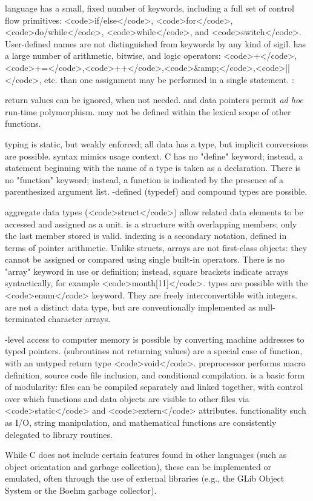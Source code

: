 \documentclass{article}\usepackage{titlesec}
\begin{document}
\begin{itemize}\itemThe language has a small, fixed number of keywords, including a full set of control flow primitives: <code>if/else</code>, <code>for</code>, <code>do/while</code>, <code>while</code>, and <code>switch</code>. User-defined names are not distinguished from keywords by any kind of sigil.
\itemIt has a large number of arithmetic, bitwise, and logic operators: <code>+</code>,<code>+=</code>,<code>++</code>,<code>&amp;</code>,<code>||</code>, etc.
\itemMore than one assignment may be performed in a single statement.
\itemFunctions:
\begin{itemize}\itemFunction return values can be ignored, when not needed.
\itemFunction and data pointers permit \emph{ad hoc} run-time polymorphism.
\itemFunctions may not be defined within the lexical scope of other functions.\end{itemize}
\itemData typing is static, but weakly enforced; all data has a type, but implicit conversions are possible.
\itemDeclaration syntax mimics usage context. C has no "define" keyword; instead, a statement beginning with the name of a type is taken as a declaration. There is no "function" keyword; instead, a function is indicated by the presence of a parenthesized argument list.
\itemUser-defined (typedef) and compound types are possible.
\begin{itemize}\itemHeterogeneous aggregate data types (<code>struct</code>) allow related data elements to be accessed and assigned as a unit.
\itemUnion is a structure with overlapping members; only the last member stored is valid.
\itemArray indexing is a secondary notation, defined in terms of pointer arithmetic. Unlike structs, arrays are not first-class objects: they cannot be assigned or compared using single built-in operators. There is no "array" keyword in use or definition; instead, square brackets indicate arrays syntactically, for example <code>month[11]</code>.
\itemEnumerated types are possible with the <code>enum</code> keyword. They are freely interconvertible with integers.
\itemStrings are not a distinct data type, but are conventionally implemented as null-terminated character arrays.\end{itemize}
\itemLow-level access to computer memory is possible by converting machine addresses to typed pointers.
\itemProcedures (subroutines not returning values) are a special case of function, with an untyped return type <code>void</code>.
\itemA preprocessor performs macro definition, source code file inclusion, and conditional compilation.
\itemThere is a basic form of modularity: files can be compiled separately and linked together, with control over which functions and data objects are visible to other files via <code>static</code> and <code>extern</code> attributes.
\itemComplex functionality such as I/O, string manipulation, and mathematical functions are consistently delegated to library routines.\end{itemize}
While C does not include certain features found in other languages (such as object orientation and garbage collection), these can be implemented or emulated, often through the use of external libraries (e.g., the GLib Object System or the Boehm garbage collector).
\\
\end{document}
